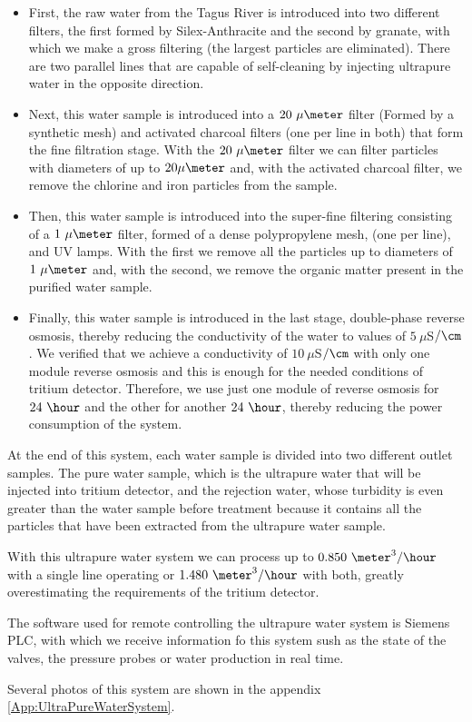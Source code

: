 \begin{itemize}
\item{} First, the raw water from the Tagus River is introduced into two different filters, the first formed by Silex-Anthracite and the second by granate, with which we make a gross filtering (the largest particles are eliminated). There are two parallel lines that are capable of self-cleaning by injecting ultrapure water in the opposite direction.

\item{} Next, this water sample is introduced into a $20~\mu\meter$ filter (Formed by a synthetic mesh) and activated charcoal filters (one per line in both) that form the fine filtration stage. With the $20~\mu\meter$ filter we can filter particles with diameters of up to $20\mu\meter$ and, with the activated charcoal filter, we remove the chlorine and iron particles from the sample.

\item{} Then, this water sample is introduced into the super-fine filtering consisting of a $1~\mu\meter$ filter, formed of a dense polypropylene mesh, (one per line), and UV lamps. With the first we remove all the particles up to diameters of $1~\mu\meter$ and, with the second, we remove the organic matter present in the purified water sample.

\item{} Finally, this water sample is introduced in the last stage, double-phase reverse osmosis, thereby reducing the conductivity of the water to values of $5~\mu$S$/\cm$. We verified that we achieve a conductivity of $10~\mu$S$/\cm$ with only one module reverse osmosis and this is enough for the needed conditions of tritium detector. Therefore, we use just one module of reverse osmosis for $24~\hour$ and the other for another $24~\hour$, thereby reducing the power consumption of the system.

\end{itemize}

At the end of this system, each water sample is divided into two different outlet samples. The pure water sample, which is the ultrapure water that will be injected into tritium detector, and the rejection water, whose turbidity is even greater than the water sample before treatment because it contains all the particles that have been extracted from the ultrapure water sample.

With this ultrapure water system we can process up to $0.850~\meter^3/\hour$ with a single line operating or $1.480~\meter^3/\hour$ with both, greatly overestimating the requirements of the tritium detector. 

The software used for remote controlling the ultrapure water system is Siemens PLC, with which we receive information fo this system sush as the state of the valves, the pressure probes or water production in real time. 

Several photos of this system are shown in the appendix \ref{App:UltraPureWaterSystem}.